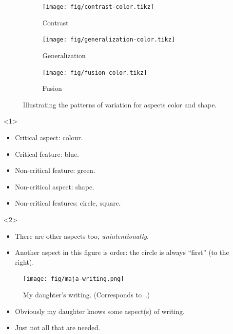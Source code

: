 \begin{frame}
  \begin{figure}
    \begin{subfigure}{0.3\columnwidth}
      \centering
      \texttt{[image: fig/contrast-color.tikz]}
      \caption{Contrast}
    \end{subfigure}
    \hfill
    \begin{subfigure}{0.3\columnwidth}
      \centering
      \texttt{[image: fig/generalization-color.tikz]}
      \caption{Generalization}
    \end{subfigure}
    \hfill
    \begin{subfigure}{0.3\columnwidth}
      \centering
      \texttt{[image: fig/fusion-color.tikz]}
      \caption{Fusion}
    \end{subfigure}
    \caption{%
      Illustrating the patterns of variation for aspects color and shape.
    }
  \end{figure}

  \begin{onlyenv}<1>
    \begin{example}
      \begin{itemize}
        \item Critical aspect: colour.
        \item Critical feature: blue.
        \item Non-critical feature: green.
        \item Non-critical aspect: shape.
        \item Non-critical features: circle, square.
      \end{itemize}
    \end{example}
  \end{onlyenv}
  \begin{onlyenv}<2>
    \begin{remark}
      \begin{itemize}
        \item There are other aspects too, \emph{unintentionally}.
        \item Another aspect in this figure is order: the circle is always 
          \enquote{first} (to the right).
      \end{itemize}
    \end{remark}
  \end{onlyenv}
\end{frame}

\begin{frame}
  \begin{figure}
    \texttt{[image: fig/maja-writing.png]}
    \caption{My daughter's writing. (Corresponds to~\cite[Fig.~2.1, 
    p.~30]{NecessaryConditionsOfLearning}.)}
  \end{figure}
  \begin{example}
    \begin{itemize}
      \item Obviously my daughter knows some aspect(s) of writing.
      \item Just not all that are needed.
    \end{itemize}
  \end{example}
\end{frame}

